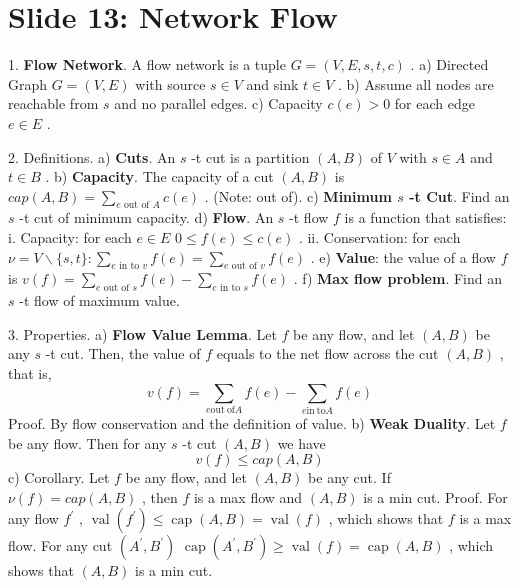 \documentclass[10pt,a4paper]{article}
\begin{document}
\section*{Slide 13: Network Flow}

1. \textbf{Flow Network}. A flow network is a tuple \(G = (V,E,s,t,c)\) .
a) Directed Graph \(G = (V,E)\) with source \(s\in V\) and sink \(t\in V\) .
b) Assume all nodes are reachable from \(s\) and no parallel edges.
c) Capacity \(c(e) > 0\) for each edge \(e\in E\) .

2. Definitions.
a) \textbf{Cuts}. An \(s\) -t cut is a partition \((A,B)\) of \(V\) with \(s\in A\) and \(t\in B\) .
b) \textbf{Capacity}. The capacity of a cut \((A,B)\) is \(cap(A,B) = \sum_{e \text{ out of } A} c(e)\) . (Note: out of).
c) \textbf{Minimum \(s\) -t Cut}. Find an \(s\) -t cut of minimum capacity.
d) \textbf{Flow}. An \(s\) -t flow \(f\) is a function that satisfies:
    i. Capacity: for each \(e\in E\) \(0\leq f(e)\leq c(e)\) .
    ii. Conservation: for each \(\nu = V\backslash \{s,t\} \colon \sum_{e \text{ in to } v} f(e) = \sum_{e \text{ out of } v} f(e)\) .
e) \textbf{Value}: the value of a flow \(f\) is \(v(f) = \sum_{e \text{ out of } s} f(e) - \sum_{e \text{ in to } s} f(e)\) .
f) \textbf{Max flow problem}. Find an \(s\) -t flow of maximum value.

3. Properties.
a) \textbf{Flow Value Lemma}. Let \(f\) be any flow, and let \((A,B)\) be any \(s\) -t cut. Then, the value of \(f\) equals to the net flow across the cut \((A,B)\) , that is,
\[
v(f) = \sum_{e\mathrm{out\ of}A}f(e) - \sum_{e\mathrm{in\ to}A}f(e)
\]
Proof. By flow conservation and the definition of value.
b) \textbf{Weak Duality}. Let \(f\) be any flow. Then for any \(s\) -t cut \((A,B)\) we have
\[
v(f)\leq cap(A,B)
\]
c) Corollary. Let \(f\) be any flow, and let \((A,B)\) be any cut. If \(\nu (f) = cap(A,B)\) , then \(f\) is a max flow and \((A,B)\) is a min cut.
Proof. For any flow \(f^{\prime}\) , \(\operatorname {val}(f^{\prime})\leq \operatorname {cap}(A,B) = \operatorname {val}(f)\) , which shows that \(f\) is a max flow. For any cut \((A^{\prime},B^{\prime})\) \(\operatorname {cap}(A^{\prime},B^{\prime})\geq \operatorname {val}(f) = \operatorname {cap}(A,B)\) , which shows that \((A,B)\) is a min cut.
\end{document}
